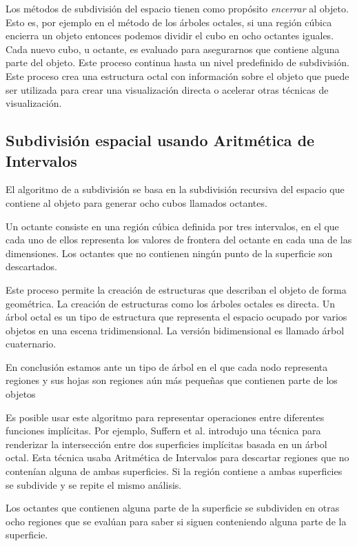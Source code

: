 Los métodos de subdivisión del espacio tienen como propósito{ \em encerrar} al objeto.  Esto es, por ejemplo en el método de los árboles octales, si una región cúbica encierra un objeto entonces podemos dividir el cubo en ocho octantes iguales. Cada nuevo cubo, u octante, es evaluado para asegurarnos que contiene alguna parte del objeto. Este proceso continua hasta un nivel predefinido de subdivisión.
\\Este proceso crea una estructura octal con información sobre el objeto que puede ser utilizada para crear una visualización directa o acelerar otras técnicas de visualización.

\subsection{Subdivisión espacial usando Aritmética de Intervalos}

El algoritmo de a subdivisión se basa en la subdivisión recursiva del espacio que contiene al objeto para generar ocho cubos llamados octantes.

Un octante consiste en una región cúbica definida por tres intervalos, en el que cada uno de ellos representa los valores de frontera del octante en cada una de las dimensiones. Los octantes que no contienen ningún punto de la superficie son descartados.

Este proceso permite la creación de estructuras que describan el objeto de forma geométrica. La creación de estructuras como los árboles octales es directa. Un árbol octal es un tipo de estructura  que representa el espacio ocupado por varios objetos en una escena tridimensional. La versión bidimensional es llamado árbol cuaternario.

En conclusión estamos ante un tipo de árbol en el que cada nodo representa regiones y sus hojas son regiones aún más pequeñas que contienen parte de los objetos

Es posible usar este algoritmo para representar operaciones entre diferentes funciones implícitas. Por ejemplo, Suffern et al.\cite{Suffern03} introdujo una técnica para renderizar la intersección entre dos superficies implícitas basada en un árbol octal. Esta técnica usaba Aritmética de Intervalos para descartar regiones que no contenían alguna de ambas superficies. Si la región contiene a ambas superficies se subdivide y se repite el mismo análisis.

Los octantes que contienen alguna parte de la superficie se subdividen en otras ocho regiones que se evalúan para saber si siguen conteniendo alguna parte de la superficie.

